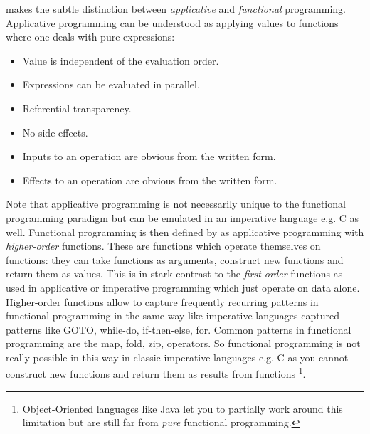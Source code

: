 \cite{maclennan_functional_1990} makes the subtle distinction between \textit{applicative} and \textit{functional} programming. Applicative programming can be understood as applying values to functions where one deals with pure expressions:

\begin{itemize}
	\item Value is independent of the evaluation order.
	\item Expressions can be evaluated in parallel.
	\item Referential transparency.
	\item No side effects.
	\item Inputs to an operation are obvious from the written form.
	\item Effects to an operation are obvious from the written form.
\end{itemize}

Note that applicative programming is not necessarily unique to the functional programming paradigm but can be emulated in an imperative language e.g. C as well. Functional programming is then defined by \cite{maclennan_functional_1990} as applicative programming with \textit{higher-order} functions. These are functions which operate themselves on functions: they can take functions as arguments, construct new functions and return them as values. This is in stark contrast to the \textit{first-order} functions as used in applicative or imperative programming which just operate on data alone. Higher-order functions allow to capture frequently recurring patterns in functional programming in the same way like imperative languages captured patterns like GOTO, while-do, if-then-else, for. Common patterns in functional programming are the map, fold, zip, operators.
So functional programming is not really possible in this way in classic imperative languages e.g. C as you cannot construct new functions and return them as results from functions \footnote{Object-Oriented languages like Java let you to partially work around this limitation but are still far from \textit{pure} functional programming.}.

